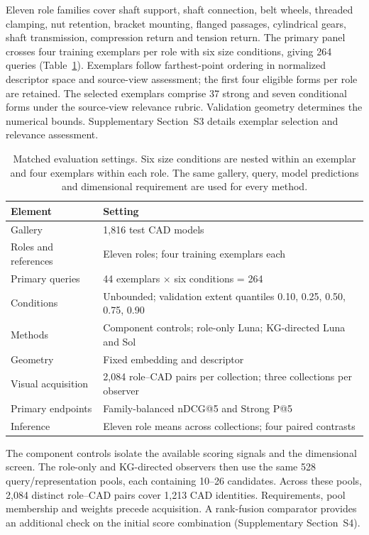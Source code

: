 \documentclass[10pt,a4paper,twocolumn]{article}
\begin{document}
Eleven role families cover shaft support, shaft connection, belt wheels, threaded clamping, nut retention, bracket mounting, flanged passages, cylindrical gears, shaft transmission, compression return and tension return. The primary panel crosses four training exemplars per role with six size conditions, giving 264 queries (Table~\ref{tab:design}). Exemplars follow farthest-point ordering in normalized descriptor space and source-view assessment; the first four eligible forms per role are retained. The selected exemplars comprise 37 strong and seven conditional forms under the source-view relevance rubric. Validation geometry determines the numerical bounds. Supplementary Section~S3 details exemplar selection and relevance assessment.

\begin{table}[t]
\centering\small
\begin{tabularx}{\columnwidth}{@{}lX@{}}
\toprule
Element & Setting \\
\midrule
Gallery & 1,816 test CAD models \\
Roles and references & Eleven roles; four training exemplars each \\
Primary queries & 44 exemplars $\times$ six conditions = 264 \\
Conditions & Unbounded; validation extent quantiles 0.10, 0.25, 0.50, 0.75, 0.90 \\
Methods & Component controls; role-only Luna; KG-directed Luna and Sol \\
Geometry & Fixed embedding and descriptor \\
Visual acquisition & 2,084 role--CAD pairs per collection; three collections per observer \\
Primary endpoints & Family-balanced nDCG@5 and Strong P@5 \\
Inference & Eleven role means across collections; four paired contrasts \\
\bottomrule
\end{tabularx}
\caption{Matched evaluation settings. Six size conditions are nested within an exemplar and four exemplars within each role. The same gallery, query, model predictions and dimensional requirement are used for every method.}
\label{tab:design}
\end{table}

The component controls isolate the available scoring signals and the dimensional screen.
The role-only and KG-directed observers then use the same 528 query/representation
pools, each containing 10--26 candidates. Across these pools, 2,084 distinct
role--CAD pairs cover 1,213 CAD identities. Requirements, pool membership and
weights precede acquisition. A rank-fusion comparator \cite{cormack2009rrf} provides an additional check on the initial score combination (Supplementary Section~S4).
\end{document}
